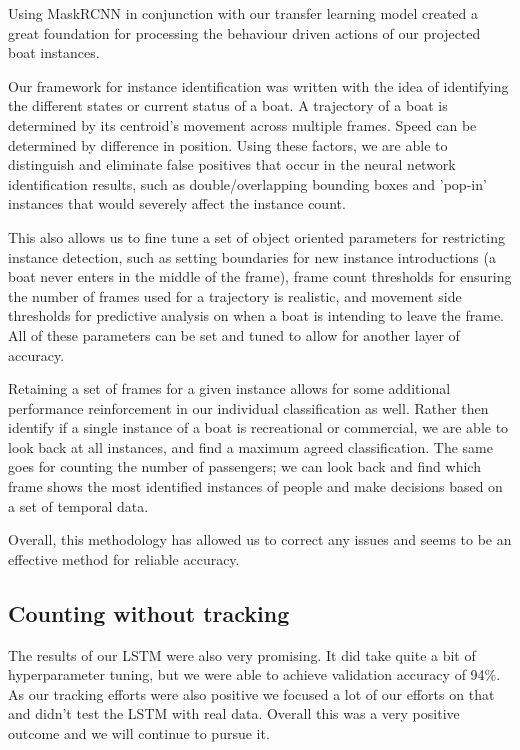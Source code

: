\documentclass[10pt,twocolumn,letterpaper]{article}
\begin{document}
Using MaskRCNN in conjunction with our transfer learning model created a great foundation for processing the behaviour driven actions of our projected boat instances.  

Our framework for instance identification was written with the idea of identifying the different states or current status of a boat.  A trajectory of a boat is determined by its centroid's movement across multiple frames.  Speed can be determined by difference in position.  Using these factors, we are able to distinguish and eliminate false positives that occur in the neural network identification results, such as double/overlapping bounding boxes and 'pop-in' instances that would severely affect the instance count.

This also allows us to fine tune a set of object oriented parameters for restricting instance detection, such as setting boundaries for new instance introductions (a boat never enters in the middle of the frame), frame count thresholds for ensuring the number of frames used for a trajectory is realistic, and movement side thresholds for predictive analysis on when a boat is intending to leave the frame.  All of these parameters can be set and tuned to allow for another layer of accuracy.

Retaining a set of frames for a given instance allows for some additional performance reinforcement in our individual classification as well.  Rather then identify if a single instance of a boat is recreational or commercial, we are able to look back at all instances, and find a maximum agreed classification.  The same goes for counting the number of passengers; we can look back and find which frame shows the most identified instances of people and make decisions based on a set of temporal data.

Overall, this methodology has allowed us to correct any issues and seems to be an effective method for reliable accuracy.

\subsection{Counting without tracking}

The results of our LSTM were also very promising. It did take quite a bit of hyperparameter tuning, but we were able to achieve validation accuracy of 94\%. As our tracking efforts were also positive we focused a lot of our efforts on that and didn't test the LSTM with real data. Overall this was a very positive outcome and we will continue to pursue it.
\end{document}
